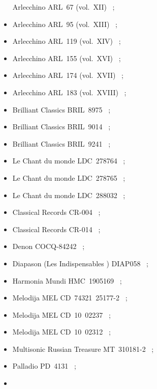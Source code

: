 \begin{itemize}
 Arlecchino ARL~67 (vol.~XII) \citep{Luguenot95a}~;
 \item
 Arlecchino ARL~95 (vol.~XIII) \citep{Luguenot95b, Schonberg95a}~;
 \item
 Arlecchino ARL~119 (vol.~XIV) \citep{Schonberg95a}~;
 \item
 Arlecchino ARL~155 (vol.~XVI) \citep{Bosch, Schonberg96}~;
 \item
 Arlecchino ARL~174 (vol.~XVII) \citep{Hawkins96}~;
 \item
 Arlecchino ARL~183 (vol.~XVIII) \citep{Hawkins96}~;
 \item
 Brilliant Classics BRIL~8975 \citep{Clarke, Cochard08b, Cowan08,
 Harrington09b, Haylock09, Naulleau11, Woolf09a}~;
 \item
 Brilliant Classics BRIL~9014 \citep{Baron09, Muhlbock}~;
 \item
 Brilliant Classics BRIL~9241 \citep{Harrington12}~;
 \item
 Le Chant du monde LDC~278764 \citep{Baron13, Boissard13, Rabinowitz89,
 Stewart}~;
 \item
 Le Chant du monde LDC~278765 \citep{Rabinowitz89, Sanders88, Simmons,
 Stewart, Sykora88}~;
 \item
 Le Chant du monde LDC~288032 \citep{Freslon92, Hawkins92, McLachlan92,
 Rabinowitz92, Rabinowitz98, Stewart}~;
 \item
 Classical Records CR-004 \citep{Woolf06}~;
 \item
 Classical Records CR-014 \citep{Leonard}~;
 \item
 Denon COCQ-84242 \citep{Marcinik}~;
 \item
 Diapason (Les Indispensables ) DIAP058 \citep{Boissard14a}~;
 \item
 Harmonia Mundi HMC~1905169 \citep{Drillon, Fanning87, Glass, LaGrange86,
 Moor87, Roux86, Wiser}~;
 \item
 Melodija MEL CD~74321~25177-2 \citep{Bernager, Fanning95, Layton,
 Pappastavrou96, Schonberg95b}~;
 \item
 Melodija MEL CD~10~02237 \citep{Arloff, Boissard14b, Cowan15,
 Harrington15a}~;
 \item
 Melodija MEL CD~10~02312 \citep{Baronian, Becker16, Boissard16, Cowan16,
 Duerer, Hoffele16, Theurich, Westbrook}~;
 \item
 Multisonic Russian Treasure MT~310181-2 \citep{Fanning94, Hoffele,
 Schonberg01}~;
 \item
 Palladio PD~4131 \citep{Evans94}~;
 \item

\end{itemize}
